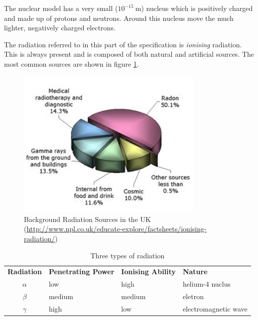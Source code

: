 \documentclass[main.tex]{subfiles}
\begin{document}

The nuclear model has a very small ($10^{-15}\ \si{\meter}$) nucleus which is positively charged and made up of protons and neutrons. Around this nucleus move the much lighter, negatively charged electrons.


The radiation referred to in this part of the specification is \emph{ionising} radiation. This is always present and is composed of both natural and artificial sources. The most common sources are shown in figure \ref{fig:rad-sources}.

\begin{figure}[h]
  \begin{center}
  \includegraphics[width=0.8\textwidth]{figs/chapt-8/rad-sources.jpg}
\end{center}
  \caption{Background Radiation Sources in the UK (\url{http://www.npl.co.uk/educate-explore/factsheets/ionising-radiation/})}
  \label{fig:rad-sources}
\end{figure}


\begin{table}[h]
\begin{tabular}{clll}
  \textbf{Radiation} & \textbf{Penetrating Power} & \textbf{Ionising Ability} & \textbf{Nature} \\
  $\alpha$ & low & high & helium-4 nuclus \\
  $\beta$ & medium & medium & eletron \\
  $\gamma$ & high & low & electromagnetic wave \\
\end{tabular}
\caption{Three types of radiation}
\label{tbl:3-rad}
\end{table}
\end{document}
